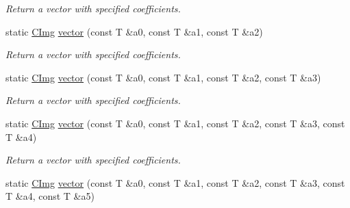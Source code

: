 \begin{DoxyCompactItemize}
\begin{DoxyCompactList}\small\item\em Return a vector with specified coefficients. \end{DoxyCompactList}\item 
\hypertarget{structcimg__library_1_1_c_img_a3b9ed1eedcdc65ef8157fbb98323a937}{static \hyperlink{structcimg__library_1_1_c_img}{C\-Img} \hyperlink{structcimg__library_1_1_c_img_a3b9ed1eedcdc65ef8157fbb98323a937}{vector} (const T \&a0, const T \&a1, const T \&a2)}\label{structcimg__library_1_1_c_img_a3b9ed1eedcdc65ef8157fbb98323a937}

\begin{DoxyCompactList}\small\item\em Return a vector with specified coefficients. \end{DoxyCompactList}\item 
\hypertarget{structcimg__library_1_1_c_img_aa79a7ebb5acb7c5bcfe1ae4fa11a123a}{static \hyperlink{structcimg__library_1_1_c_img}{C\-Img} \hyperlink{structcimg__library_1_1_c_img_aa79a7ebb5acb7c5bcfe1ae4fa11a123a}{vector} (const T \&a0, const T \&a1, const T \&a2, const T \&a3)}\label{structcimg__library_1_1_c_img_aa79a7ebb5acb7c5bcfe1ae4fa11a123a}

\begin{DoxyCompactList}\small\item\em Return a vector with specified coefficients. \end{DoxyCompactList}\item 
\hypertarget{structcimg__library_1_1_c_img_ad4cda0c37ddc5e045d028e52cf96c86e}{static \hyperlink{structcimg__library_1_1_c_img}{C\-Img} \hyperlink{structcimg__library_1_1_c_img_ad4cda0c37ddc5e045d028e52cf96c86e}{vector} (const T \&a0, const T \&a1, const T \&a2, const T \&a3, const T \&a4)}\label{structcimg__library_1_1_c_img_ad4cda0c37ddc5e045d028e52cf96c86e}

\begin{DoxyCompactList}\small\item\em Return a vector with specified coefficients. \end{DoxyCompactList}\item 
\hypertarget{structcimg__library_1_1_c_img_af21a33fa3eda136ef8bd1a77e8db4672}{static \hyperlink{structcimg__library_1_1_c_img}{C\-Img} \hyperlink{structcimg__library_1_1_c_img_af21a33fa3eda136ef8bd1a77e8db4672}{vector} (const T \&a0, const T \&a1, const T \&a2, const T \&a3, const T \&a4, const T \&a5)}\label{structcimg__library_1_1_c_img_af21a33fa3eda136ef8bd1a77e8db4672}


\end{DoxyCompactItemize}
